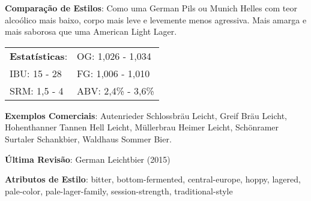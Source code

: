 \textbf{Comparação de Estilos}: Como uma German Pils ou Munich Helles com teor alcoólico mais baixo, corpo mais leve e levemente menos agressiva. Mais amarga e mais saborosa que uma American Light Lager.

\begin{tabular}{@{}p{35mm}p{35mm}@{}}
  \textbf{Estatísticas}: & OG: 1,026 - 1,034 \\
  IBU: 15 - 28  & FG: 1,006 - 1,010  \\
  SRM: 1,5 - 4  & ABV: 2,4\% - 3,6\%
\end{tabular}

\textbf{Exemplos Comerciais}: Autenrieder Schlossbräu Leicht, Greif Bräu Leicht, Hohenthanner Tannen Hell Leicht, Müllerbrau Heimer Leicht, Schönramer Surtaler Schankbier, Waldhaus Sommer Bier.

\textbf{Última Revisão}: German Leichtbier (2015)

\textbf{Atributos de Estilo}: bitter, bottom-fermented, central-europe, hoppy, lagered, pale-color, pale-lager-family, session-strength, traditional-style
